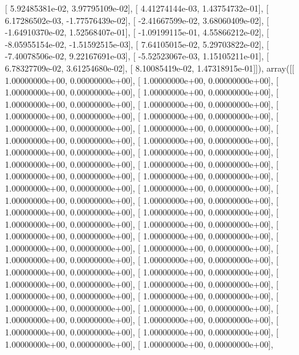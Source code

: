 \documentclass{article}
\begin{document}
       [  5.92485381e-02,   3.97795109e-02],
       [  4.41274144e-03,   1.43754732e-01],
       [  6.17286502e-03,  -1.77576439e-02],
       [ -2.41667599e-02,   3.68060409e-02],
       [ -1.64910370e-02,   1.52568407e-01],
       [ -1.09199115e-01,   4.55866212e-02],
       [ -8.05955154e-02,  -1.51592515e-03],
       [  7.64105015e-02,   5.29703822e-02],
       [ -7.40078506e-02,   9.22167691e-03],
       [ -5.52523067e-03,   1.15105211e-01],
       [  6.78327709e-02,   3.61254680e-02],
       [  8.10085419e-02,   1.47318915e-01]]), array([[  1.00000000e+00,   0.00000000e+00],
       [  1.00000000e+00,   0.00000000e+00],
       [  1.00000000e+00,   0.00000000e+00],
       [  1.00000000e+00,   0.00000000e+00],
       [  1.00000000e+00,   0.00000000e+00],
       [  1.00000000e+00,   0.00000000e+00],
       [  1.00000000e+00,   0.00000000e+00],
       [  1.00000000e+00,   0.00000000e+00],
       [  1.00000000e+00,   0.00000000e+00],
       [  1.00000000e+00,   0.00000000e+00],
       [  1.00000000e+00,   0.00000000e+00],
       [  1.00000000e+00,   0.00000000e+00],
       [  1.00000000e+00,   0.00000000e+00],
       [  1.00000000e+00,   0.00000000e+00],
       [  1.00000000e+00,   0.00000000e+00],
       [  1.00000000e+00,   0.00000000e+00],
       [  1.00000000e+00,   0.00000000e+00],
       [  1.00000000e+00,   0.00000000e+00],
       [  1.00000000e+00,   0.00000000e+00],
       [  1.00000000e+00,   0.00000000e+00],
       [  1.00000000e+00,   0.00000000e+00],
       [  1.00000000e+00,   0.00000000e+00],
       [  1.00000000e+00,   0.00000000e+00],
       [  1.00000000e+00,   0.00000000e+00],
       [  1.00000000e+00,   0.00000000e+00],
       [  1.00000000e+00,   0.00000000e+00],
       [  1.00000000e+00,   0.00000000e+00],
       [  1.00000000e+00,   0.00000000e+00],
       [  1.00000000e+00,   0.00000000e+00],
       [  1.00000000e+00,   0.00000000e+00],
       [  1.00000000e+00,   0.00000000e+00],
       [  1.00000000e+00,   0.00000000e+00],
       [  1.00000000e+00,   0.00000000e+00],
       [  1.00000000e+00,   0.00000000e+00],
       [  1.00000000e+00,   0.00000000e+00],
       [  1.00000000e+00,   0.00000000e+00],
       [  1.00000000e+00,   0.00000000e+00],
       [  1.00000000e+00,   0.00000000e+00],
       [  1.00000000e+00,   0.00000000e+00],
       [  1.00000000e+00,   0.00000000e+00],
       [  1.00000000e+00,   0.00000000e+00],
       [  1.00000000e+00,   0.00000000e+00],
       [  1.00000000e+00,   0.00000000e+00],
       [  1.00000000e+00,   0.00000000e+00],
       [  1.00000000e+00,   0.00000000e+00],
       [  1.00000000e+00,   0.00000000e+00],
\end{document}
